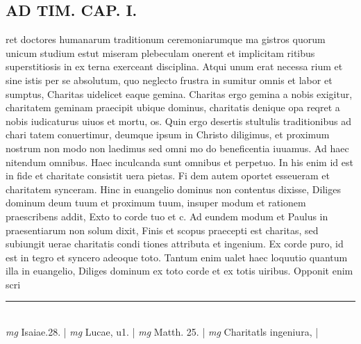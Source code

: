 \documentclass{article}
\begin{document}
\begin{pages}
\section*{AD TIM. CAP. I. }
\marginpar{[ p.98 ]}\pstart ret doctores humanarum traditionum ceremoniarumque ma gistros quorum unicum studium estut miseram plebeculam onerent et implicitam ritibus superstitiosis in ex terna exerceant disciplina. Atqui unum erat necessa rium et sine istis per se absolutum, quo neglecto frustra in sumitur omnis et labor et sumptus, Charitas uidelicet eaque gemina. Charitas ergo gemina a nobis exigitur, charitatem geminam praecipit ubique dominus, charitatis denique opa reqret a nobis iudicaturus uiuos et mortu, os. Quin ergo desertis stultulis traditionibus ad chari tatem conuertimur, deumque ipsum in Christo diligimus, et proximum nostrum non modo non laedimus sed omni mo do beneficentia iuuamus. Ad haec nitendum omnibus. Haec inculcanda sunt omnibus et perpetuo. In his enim id est in fide et charitate consistit uera pietas. Fi dem autem oportet esseueram et charitatem synceram. Hinc in euangelio dominus non contentus dixisse, Diliges dominum deum tuum et proximum tuum, insuper modum et rationem praescribens addit, Exto to corde tuo et c. Ad eundem modum et Paulus in praesentiarum non solum dixit, Finis et scopus praecepti est charitas, sed subiungit uerae charitatis condi tiones attributa et ingenium. Ex corde puro, id est in tegro et syncero adeoque toto. Tantum enim ualet haec loquutio quantum illa in euangelio, Diliges dominum ex toto corde et ex totis uiribus. Opponit enim scri\pend
\vspace{0.5cm}\noindent
\vspace{0.2cm}\rule{1cm}{0.2pt}\\ 
\hspace{0.2cm}\textit{mg}
\footnotesize Isaiae.28. 
\normalsize| 
\hspace{0.2cm}\textit{mg}
\footnotesize Lucae, u1. 
\normalsize| 
\hspace{0.2cm}\textit{mg}
\footnotesize Matth. 25. 
\normalsize| 
\hspace{0.2cm}\textit{mg}
\footnotesize Charitatls ingeniura, 
\normalsize| 

\end{pages}
\end{document}
